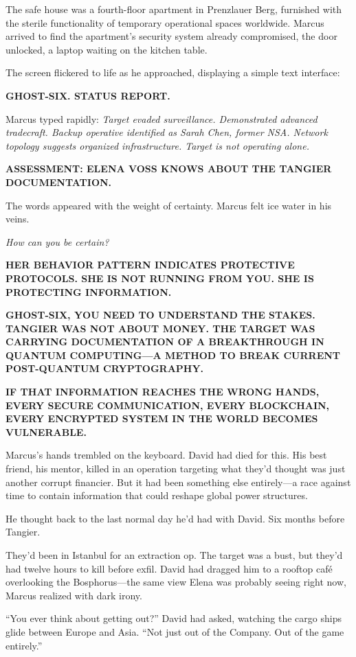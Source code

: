 The safe house was a fourth-floor apartment in Prenzlauer Berg, furnished with the sterile functionality of temporary operational spaces worldwide. Marcus arrived to find the apartment's security system already compromised, the door unlocked, a laptop waiting on the kitchen table.

The screen flickered to life as he approached, displaying a simple text interface:

\textbf{GHOST-SIX. STATUS REPORT.}

Marcus typed rapidly: \emph{Target evaded surveillance. Demonstrated advanced tradecraft. Backup operative identified as Sarah Chen, former NSA. Network topology suggests organized infrastructure. Target is not operating alone.}

\textbf{ASSESSMENT: ELENA VOSS KNOWS ABOUT THE TANGIER DOCUMENTATION.}

The words appeared with the weight of certainty. Marcus felt ice water in his veins.

\emph{How can you be certain?}

\textbf{HER BEHAVIOR PATTERN INDICATES PROTECTIVE PROTOCOLS. SHE IS NOT RUNNING FROM YOU. SHE IS PROTECTING INFORMATION.}

\textbf{GHOST-SIX, YOU NEED TO UNDERSTAND THE STAKES. TANGIER WAS NOT ABOUT MONEY. THE TARGET WAS CARRYING DOCUMENTATION OF A BREAKTHROUGH IN QUANTUM COMPUTING---A METHOD TO BREAK CURRENT POST-QUANTUM CRYPTOGRAPHY.}

\textbf{IF THAT INFORMATION REACHES THE WRONG HANDS, EVERY SECURE COMMUNICATION, EVERY BLOCKCHAIN, EVERY ENCRYPTED SYSTEM IN THE WORLD BECOMES VULNERABLE.}

Marcus's hands trembled on the keyboard. David had died for this. His best friend, his mentor, killed in an operation targeting what they'd thought was just another corrupt financier. But it had been something else entirely---a race against time to contain information that could reshape global power structures.

He thought back to the last normal day he'd had with David. Six months before Tangier.

They'd been in Istanbul for an extraction op. The target was a bust, but they'd had twelve hours to kill before exfil. David had dragged him to a rooftop café overlooking the Bosphorus---the same view Elena was probably seeing right now, Marcus realized with dark irony.

``You ever think about getting out?'' David had asked, watching the cargo ships glide between Europe and Asia. ``Not just out of the Company. Out of the game entirely.''

